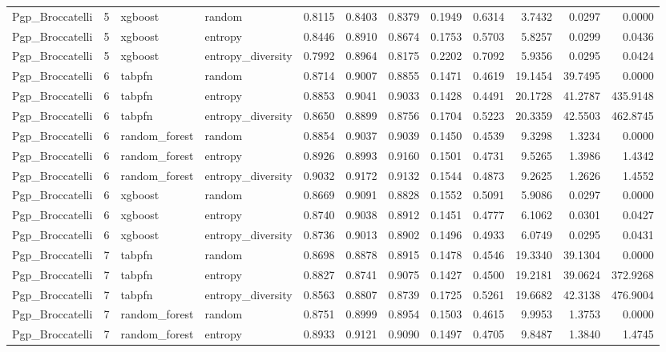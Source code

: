 \begin{tabular}{lrllrrrrrrrr}
Pgp_Broccatelli & 5 & xgboost & random & 0.8115 & 0.8403 & 0.8379 & 0.1949 & 0.6314 & 3.7432 & 0.0297 & 0.0000 \\
Pgp_Broccatelli & 5 & xgboost & entropy & 0.8446 & 0.8910 & 0.8674 & 0.1753 & 0.5703 & 5.8257 & 0.0299 & 0.0436 \\
Pgp_Broccatelli & 5 & xgboost & entropy_diversity & 0.7992 & 0.8964 & 0.8175 & 0.2202 & 0.7092 & 5.9356 & 0.0295 & 0.0424 \\
Pgp_Broccatelli & 6 & tabpfn & random & 0.8714 & 0.9007 & 0.8855 & 0.1471 & 0.4619 & 19.1454 & 39.7495 & 0.0000 \\
Pgp_Broccatelli & 6 & tabpfn & entropy & 0.8853 & 0.9041 & 0.9033 & 0.1428 & 0.4491 & 20.1728 & 41.2787 & 435.9148 \\
Pgp_Broccatelli & 6 & tabpfn & entropy_diversity & 0.8650 & 0.8899 & 0.8756 & 0.1704 & 0.5223 & 20.3359 & 42.5503 & 462.8745 \\
Pgp_Broccatelli & 6 & random_forest & random & 0.8854 & 0.9037 & 0.9039 & 0.1450 & 0.4539 & 9.3298 & 1.3234 & 0.0000 \\
Pgp_Broccatelli & 6 & random_forest & entropy & 0.8926 & 0.8993 & 0.9160 & 0.1501 & 0.4731 & 9.5265 & 1.3986 & 1.4342 \\
Pgp_Broccatelli & 6 & random_forest & entropy_diversity & 0.9032 & 0.9172 & 0.9132 & 0.1544 & 0.4873 & 9.2625 & 1.2626 & 1.4552 \\
Pgp_Broccatelli & 6 & xgboost & random & 0.8669 & 0.9091 & 0.8828 & 0.1552 & 0.5091 & 5.9086 & 0.0297 & 0.0000 \\
Pgp_Broccatelli & 6 & xgboost & entropy & 0.8740 & 0.9038 & 0.8912 & 0.1451 & 0.4777 & 6.1062 & 0.0301 & 0.0427 \\
Pgp_Broccatelli & 6 & xgboost & entropy_diversity & 0.8736 & 0.9013 & 0.8902 & 0.1496 & 0.4933 & 6.0749 & 0.0295 & 0.0431 \\
Pgp_Broccatelli & 7 & tabpfn & random & 0.8698 & 0.8878 & 0.8915 & 0.1478 & 0.4546 & 19.3340 & 39.1304 & 0.0000 \\
Pgp_Broccatelli & 7 & tabpfn & entropy & 0.8827 & 0.8741 & 0.9075 & 0.1427 & 0.4500 & 19.2181 & 39.0624 & 372.9268 \\
Pgp_Broccatelli & 7 & tabpfn & entropy_diversity & 0.8563 & 0.8807 & 0.8739 & 0.1725 & 0.5261 & 19.6682 & 42.3138 & 476.9004 \\
Pgp_Broccatelli & 7 & random_forest & random & 0.8751 & 0.8999 & 0.8954 & 0.1503 & 0.4615 & 9.9953 & 1.3753 & 0.0000 \\
Pgp_Broccatelli & 7 & random_forest & entropy & 0.8933 & 0.9121 & 0.9090 & 0.1497 & 0.4705 & 9.8487 & 1.3840 & 1.4745 \\

\end{tabular}
